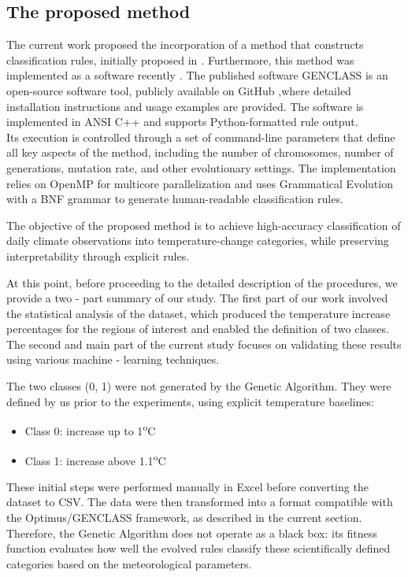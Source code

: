 \documentclass[12pt]{Definitions/academia}
\begin{document}
\subsection{\textmd{The proposed method\label{subsec:The-proposed-method}}}

The current work proposed the incorporation of a method that constructs
classification rules, initially proposed in \textit{\cite{Tsoulos 2020}.}
Furthermore, this method was implemented as a software recently \textit{\cite{Anastasopoulos 2021}.}
The published software GENCLASS is an open\nobreakdash-source software
tool, publicly available on GitHub \cite{GitHub},where detailed installation 
instructions and usage examples are provided.
The software is implemented in ANSI C++ and supports Python\nobreakdash-formatted
rule output.\\
 Its execution is controlled through a set of command\nobreakdash-line
parameters that define all key aspects of the method, including the
number of chromosomes, number of generations, mutation rate, and other
evolutionary settings. The implementation relies on OpenMP for multicore
parallelization and uses Grammatical Evolution with a BNF grammar
to generate human\nobreakdash-readable classification rules.

The objective of the proposed method is to achieve high-accuracy classification
of daily climate observations into temperature-change categories,
while preserving interpretability through explicit rules.

{At this point, before proceeding to the detailed description of the procedures, we provide a two - part summary of our study. The first part of our work involved the statistical analysis of the dataset, which produced the temperature increase percentages for the regions of interest and enabled the definition of two classes. The second and main part of the current study focuses on validating these results using various machine - learning techniques.}

{The two classes (0, 1) were not generated by the Genetic Algorithm. They were defined by us prior to the experiments, using explicit temperature baselines:
\begin{itemize}
	\item Class 0: increase up to 1\textsuperscript{o}C
	\item Class 1: increase above 1.1\textsuperscript{o}C
	\end{itemize}}

{These initial steps were performed manually in Excel before converting the dataset to CSV. The data were then transformed into a format compatible with the Optimus/GENCLASS framework, as described in the current section.
Therefore, the Genetic Algorithm does not operate as a black box: its fitness function evaluates how well the evolved rules classify these scientifically defined categories based on the meteorological parameters.}
\end{document}
